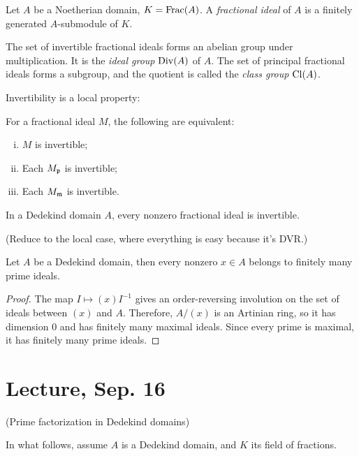 \documentclass[11pt]{amsart}
\begin{document}
\begin{defn}
Let $A$ be a Noetherian domain, $K = \operatorname{Frac}(A)$. A \emph{fractional ideal} of $A$ is a finitely generated $A$-submodule of $K$.
\end{defn}

The set of invertible fractional ideals forms an abelian group under multiplication. It is the \emph{ideal group} $\operatorname{Div}(A)$ of $A$. The set of principal fractional ideals forms a subgroup, and the quotient is called the \emph{class group} $\operatorname{Cl}(A)$.

Invertibility is a local property:

\begin{prop}
For a fractional ideal $M$, the following are equivalent:
\begin{enumerate}[(i)]
    \item $M$ is invertible;
    \item Each $M_{\mathfrak{p}}$ is invertible;
    \item Each $M_{\mathfrak{m}}$ is invertible.
\end{enumerate}
\end{prop}

\begin{cor}
In a Dedekind domain $A$, every nonzero fractional ideal is invertible.
\end{cor}

(Reduce to the local case, where everything is easy because it's DVR.)

\begin{prop}
Let $A$ be a Dedekind domain, then every nonzero $x\in A$ belongs to finitely many prime ideals.
\end{prop}

\begin{proof}
The map $I\mapsto (x)I^{-1}$ gives an order-reversing involution on the set of ideals between $(x)$ and $A$. Therefore, $A/(x)$ is an Artinian ring, so it has dimension 0 and has finitely many maximal ideals. Since every prime is maximal, it has finitely many prime ideals.
\end{proof}


\section{Lecture, Sep. 16}

(Prime factorization in Dedekind domains)

In what follows, assume $A$ is a Dedekind domain, and $K$ its field of fractions.
\end{document}
